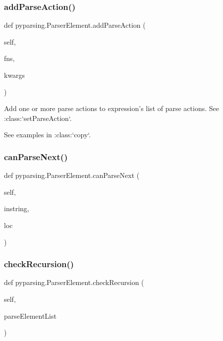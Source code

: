 \subsubsection{\texorpdfstring{add\+Parse\+Action()}{addParseAction()}}
{\footnotesize\ttfamily def pyparsing.\+Parser\+Element.\+add\+Parse\+Action (\begin{DoxyParamCaption}\item[{}]{self,  }\item[{}]{fns,  }\item[{}]{kwargs }\end{DoxyParamCaption})}

\begin{DoxyVerb}Add one or more parse actions to expression's list of parse actions. See :class:`setParseAction`.

See examples in :class:`copy`.
\end{DoxyVerb}
 \mbox{\label{classpyparsing_1_1ParserElement_aa032e6999773cbb5c0048eb9b2b6bacb}} 
\subsubsection{\texorpdfstring{can\+Parse\+Next()}{canParseNext()}}
{\footnotesize\ttfamily def pyparsing.\+Parser\+Element.\+can\+Parse\+Next (\begin{DoxyParamCaption}\item[{}]{self,  }\item[{}]{instring,  }\item[{}]{loc }\end{DoxyParamCaption})}

\mbox{\label{classpyparsing_1_1ParserElement_a46cfe4be87dff6cb52586a0b4ead2b79}} 
\subsubsection{\texorpdfstring{check\+Recursion()}{checkRecursion()}}
{\footnotesize\ttfamily def pyparsing.\+Parser\+Element.\+check\+Recursion (\begin{DoxyParamCaption}\item[{}]{self,  }\item[{}]{parse\+Element\+List }\end{DoxyParamCaption})}

